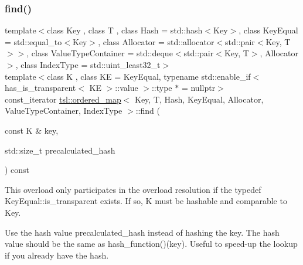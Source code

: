 \subsubsection{\texorpdfstring{find()}{find()}\hspace{0.1cm}{\footnotesize\ttfamily [6/6]}}
{\footnotesize\ttfamily template$<$class Key , class T , class Hash  = std\+::hash$<$\+Key$>$, class Key\+Equal  = std\+::equal\+\_\+to$<$\+Key$>$, class Allocator  = std\+::allocator$<$std\+::pair$<$\+Key, T$>$$>$, class Value\+Type\+Container  = std\+::deque$<$std\+::pair$<$\+Key, T$>$, Allocator$>$, class Index\+Type  = std\+::uint\+\_\+least32\+\_\+t$>$ \\
template$<$class K , class KE  = Key\+Equal, typename std\+::enable\+\_\+if$<$ has\+\_\+is\+\_\+transparent$<$ K\+E $>$\+::value $>$\+::type $\ast$  = nullptr$>$ \\
const\+\_\+iterator \mbox{\hyperlink{classtsl_1_1ordered__map}{tsl\+::ordered\+\_\+map}}$<$ Key, T, Hash, Key\+Equal, Allocator, Value\+Type\+Container, Index\+Type $>$\+::find (\begin{DoxyParamCaption}\item[{const K \&}]{key,  }\item[{std\+::size\+\_\+t}]{precalculated\+\_\+hash }\end{DoxyParamCaption}) const\hspace{0.3cm}{\ttfamily [inline]}}





This overload only participates in the overload resolution if the typedef Key\+Equal\+::is\+\_\+transparent exists. If so, K must be hashable and comparable to Key.

Use the hash value \textquotesingle{}precalculated\+\_\+hash\textquotesingle{} instead of hashing the key. The hash value should be the same as hash\+\_\+function()(key). Useful to speed-\/up the lookup if you already have the hash. \mbox{\label{classtsl_1_1ordered__map_afc365c7b0c083992f03f05a168f9d1e4}} 
